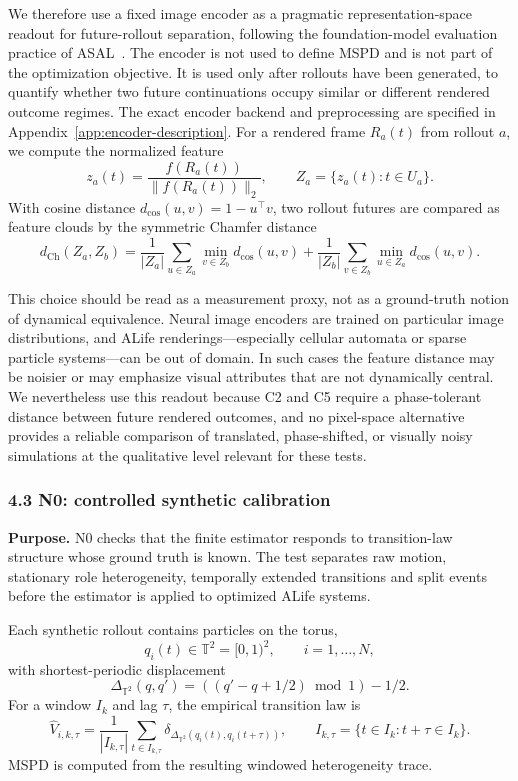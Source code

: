 We therefore use a fixed image encoder as a pragmatic representation-space readout for future-rollout separation, following the foundation-model evaluation practice of ASAL~\cite{kumar2024automating}.  The encoder is not used to define MSPD and is not part of the optimization objective.  It is used only after rollouts have been generated, to quantify whether two future continuations occupy similar or different rendered outcome regimes.  The exact encoder backend and preprocessing are specified in Appendix~\ref{app:encoder-description}.  For a rendered frame $R_a(t)$ from rollout $a$, we compute the normalized feature
\[
  z_a(t)=\frac{f(R_a(t))}{\|f(R_a(t))\|_2},
  \qquad
  Z_a=\{z_a(t):t\in U_a\}.
\]
With cosine distance $d_{\cos}(u,v)=1-u^\top v$, two rollout futures are compared as feature clouds by the symmetric Chamfer distance
\[
  d_{\mathrm{Ch}}(Z_a,Z_b)=
  \frac{1}{|Z_a|}\sum_{u\in Z_a}\min_{v\in Z_b}d_{\cos}(u,v)
  +
  \frac{1}{|Z_b|}\sum_{v\in Z_b}\min_{u\in Z_a}d_{\cos}(u,v).
\]

This choice should be read as a measurement proxy, not as a ground-truth notion of dynamical equivalence.  Neural image encoders are trained on particular image distributions, and ALife renderings---especially cellular automata or sparse particle systems---can be out of domain.  In such cases the feature distance may be noisier or may emphasize visual attributes that are not dynamically central.  We nevertheless use this readout because C2 and C5 require a phase-tolerant distance between future rendered outcomes, and no pixel-space alternative provides a reliable comparison of translated, phase-shifted, or visually noisy simulations at the qualitative level relevant for these tests.

\subsubsection*{4.3 N0: controlled synthetic calibration}
\label{experiments:synthetic}

\textbf{Purpose.}  N0 checks that the finite estimator responds to transition-law structure whose ground truth is known.  The test separates raw motion, stationary role heterogeneity, temporally extended transitions and split events before the estimator is applied to optimized ALife systems.

Each synthetic rollout contains particles on the torus,
\[
  q_i(t)\in \mathbb T^2=[0,1)^2,
  \qquad i=1,\ldots,N,
\]
with shortest-periodic displacement
\[
  \Delta_{\mathbb T^2}(q,q')=((q'-q+1/2)\bmod 1)-1/2.
\]
For a window $I_k$ and lag $\tau$, the empirical transition law is
\[
  \widehat V_{i,k,\tau}
  =\frac{1}{|I_{k,\tau}|}
  \sum_{t\in I_{k,\tau}}
  \delta_{\Delta_{\mathbb T^2}(q_i(t),q_i(t+\tau))},
  \qquad I_{k,\tau}=\{t\in I_k:t+\tau\in I_k\}.
\]
MSPD is computed from the resulting windowed heterogeneity trace.

